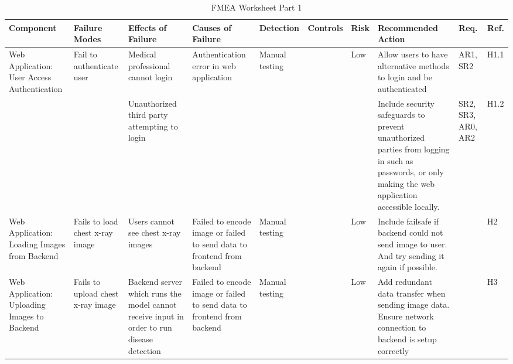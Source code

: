\documentclass{article}
\begin{document}
\begin{landscape}
  \begin{table}[hp]
    \caption{FMEA Worksheet Part 1} \label{FMEA}
    \centering
    \begin{footnotesize}
      \begin{tabular}{|p{0.8in}|p{1in}|p{1.2in}|p{1.5in}|p{0.6in}|p{0.8in}|p{0.3in}|p{2.2in}|p{0.2in}|p{0.2in}|}
        \toprule
        \textbf{Component} & \textbf{Failure Modes} & \textbf{Effects of Failure} &
        \textbf{Causes of Failure} & \textbf{Detection} & \textbf{Controls} & \textbf{Risk} &
        \textbf{Recommended Action} & \textbf{Req.} & \textbf{Ref.} \\
        \bottomrule

        \multirow{2}{1in}{Web Application: User Access Authentication} &
        \multirow{2}{1in}{Fail to authenticate user} &
        Medical professional cannot login &
        \multirow{2}{1.5in}{Authentication error in web application} &
        \multirow{2}{0.6in}{Manual testing} & &
        \multirow{2}{0.3in}{Low} &
        Allow users to have alternative methods to login and be authenticated &
        AR1, SR2 &
        H1.1 \\
        \cline{3-3}\cline{8-10}
        & &
        Unauthorized third party attempting to login & & & & &
        Include security safeguards to prevent unauthorized parties from logging in such as
        passwords, or only making the web application accessible locally. &
        SR2, SR3, AR0, AR2 &
        H1.2 \\
        \hline

        Web Application: Loading Images from Backend &
        Fails to load chest x-ray image &
        Users cannot see chest x-ray images &
        Failed to encode image or failed to send data to frontend from backend &
        Manual testing & &
        Low &
        Include failsafe if backend could not send image to user. And try sending it again if
        possible. & &
        H2 \\
        \hline

        Web Application: Uploading Images to Backend &
        Fails to upload chest x-ray image &
        Backend server which runs the model cannot receive input in order to run disease
        detection &
        Failed to encode image or failed to send data to frontend from backend &
        Manual testing & &
        Low &
        Add redundant data transfer when sending image data. Ensure network connection to backend
        is setup correctly & &
        H3 \\
        \hline


\end{tabular}
\end{footnotesize}
\end{table}
\end{landscape}
\end{document}
